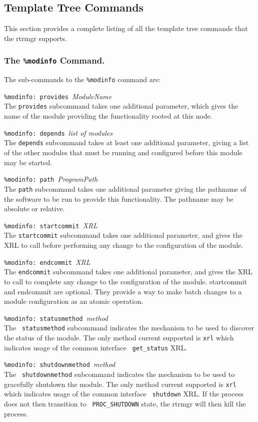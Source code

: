 \documentclass[11pt]{article}
\begin{document}
\subsection{Template Tree Commands}
This section provides a complete listing of all the template tree
commands that the rtrmgr supports.
\subsubsection{The {\tt \%modinfo} Command.}
The sub-commands to the {\tt \%modinfo} command are:
\begin{description}
\item {{\tt \%modinfo: provides }{\it ModuleName}}  \\The {\tt provides} subcommand takes one additional
parameter, which gives the name of the module providing the
functionality rooted at this node.  
\item {{\tt \%modinfo: depends }{\it list of modules}}  \\The {\tt depends} subcommand takes at least one additional
parameter, giving a list of the other modules that must
be running and configured before this module may be started.
\item {{\tt \%modinfo: path }{\it ProgramPath}}  \\The {\tt path} subcommand takes one additional parameter giving the pathname of the software to be run
to provide this functionality.  The pathname may be absolute or
relative.
\item {{\tt \%modinfo: startcommit }{\it XRL}}  \\The {\tt startcommit} subcommand takes one additional
parameter, and gives the XRL to call before performing
any change to the configuration of the module.
\item {{\tt \%modinfo: endcommit }{\it XRL}}  \\The {\tt endcommit} subcommand takes one additional
parameter, and gives the XRL to call to complete any
change to the configuration of the module.  startcommit and
endcommit are optional.  They provide a way to make batch changes to a
module configuration as an atomic operation.
\item {{\tt \%modinfo: statusmethod }{\it method}}  \\The {\tt
statusmethod} subcommand indicates the mechanism to be used to
discover the status of the module.  The only method current supported
is {\tt xrl} which indicates usage of the common interface {\tt
get\_status} XRL.
\item {{\tt \%modinfo: shutdownmethod }{\it method}}  \\The {\tt
shutdownmethod} subcommand indicates the mechanism to be used to
gracefully shutdown the module.  The only method current supported
is {\tt xrl} which indicates usage of the common interface {\tt
shutdown} XRL.  If the process does not then transition to {\tt
PROC\_SHUTDOWN} state, the rtrmgr will then kill the process.
\end{description}
\end{document}
